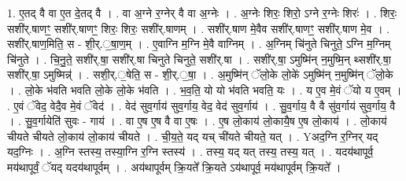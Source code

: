 \documentclass[17pt]{extarticle}
\begin{document}
1. ए॒तद् वै वा ए॒त दे॒तद् वै । . वा अ॒ग्ने र॒ग्नेर् वै वा अ॒ग्नेः । . अ॒ग्नेः शिरः॒ शिरो॒ ऽग्ने र॒ग्नेः शिरः॑ । . शिरः॒ सशी॑र्.षाणꣳ॒॒ सशी॑र्.षाणꣳ॒॒ शिरः॒ शिरः॒ सशी॑र्.षाणम् । . सशी॑र्.षाण मे॒वैव सशी॑र्.षाणꣳ॒॒ सशी॑र्.षाण मे॒व । . सशी॑र्.षाण॒मिति॒ स - शी॒र्.॒षा॒ण॒म् । . ए॒वाग्नि म॒ग्नि मे॒वै वाग्निम् । . अ॒ग्निम् चि॑नुते चिनुते॒ ऽग्नि म॒ग्निम् चि॑नुते । . चि॒नु॒ते॒ सशी॑र्.षा॒ सशी॑र्.षा चिनुते चिनुते॒ सशी॑र्.षा । . सशी॑र्.षा॒ ऽमुष्मि॑न् न॒मुष्मि॒न् थ्सशी॑र्.षा॒ सशी॑र्.षा॒ ऽमुष्मिन्न्॑ । . सशी॒र्.॒षेति॒ स - शी॒र्.॒षा॒ । . अ॒मुष्मि॑न् ॅलो॒के लो॒के॑ ऽमुष्मि॑न् न॒मुष्मि॑न् ॅलो॒के । . लो॒के भ॑वति भवति लो॒के लो॒के भ॑वति । . भ॒व॒ति॒ यो यो भ॑वति भवति॒ यः । . य ए॒व मे॒वं ॅयो य ए॒वम् । . ए॒वं ॅवेद॒ वेदै॒व मे॒वं ॅवेद॑ । . वेद॑ सुव॒र्गाय॑ सुव॒र्गाय॒ वेद॒ वेद॑ सुव॒र्गाय॑ । . सु॒व॒र्गाय॒ वै वै सु॑व॒र्गाय॑ सुव॒र्गाय॒ वै । . सु॒व॒र्गायेति॑ सुवः - गाय॑ । . वा ए॒ष ए॒ष वै वा ए॒षः । . ए॒ष लो॒काय॑ लो॒कायै॒ष ए॒ष लो॒काय॑ । . लो॒काय॑ चीयते चीयते लो॒काय॑ लो॒काय॑ चीयते । . ची॒य॒ते॒ यद् यच् ची॑यते चीयते॒ यत् । . Yअद॒ग्नि र॒ग्निर् यद् यद॒ग्निः । . अ॒ग्नि स्तस्य॒ तस्या॒ग्नि र॒ग्नि स्तस्य॑ । . तस्य॒ यद् यत् तस्य॒ तस्य॒ यत् । . यदय॑थापूर्व॒ मय॑थापूर्वं॒ ॅयद् यदय॑थापूर्वम् । . अय॑थापूर्वम् क्रि॒यते᳚ क्रि॒यते ऽय॑थापूर्व॒ मय॑थापूर्वम् क्रि॒यते᳚ । \newline
\end{document}
